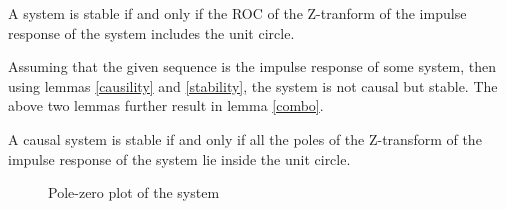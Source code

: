 \documentclass[journal,12pt,twocolumn]{IEEEtran}
\begin{document}
\begin{lemma}
A system is stable if and only if the ROC of the Z-tranform of the impulse response of the system includes the unit circle.
\label{stability}
\end{lemma}

Assuming that the given sequence is the impulse response of some system, then using lemmas \ref{causility} and \ref{stability}, the system is not causal but stable. The above two lemmas further result in lemma \ref{combo}.
\begin{lemma}
A causal system is stable if and only if all the poles of the Z-transform of the impulse response of the system lie inside the unit circle.
\label{combo}
\end{lemma}

\begin{figure}
    \centering
    \caption{Pole-zero plot of the system}
    \label{plot}
\end{figure}
\end{document}
